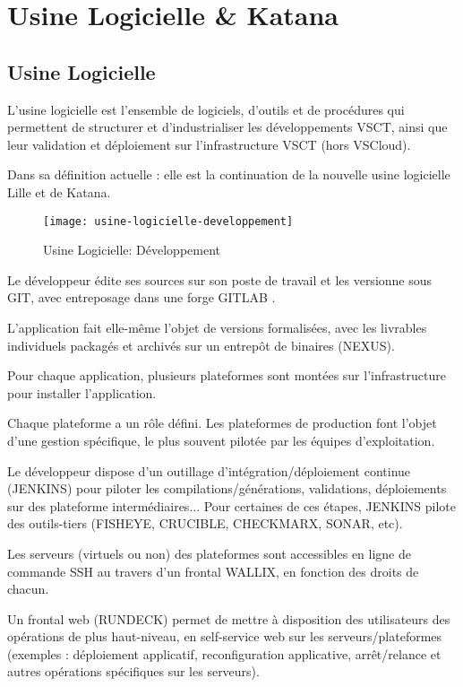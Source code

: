 \section{Usine Logicielle \& Katana}

\subsection{Usine Logicielle}
L'usine logicielle est l'ensemble de logiciels, d'outils et de procédures qui permettent de structurer et d'industrialiser les développements VSCT, ainsi que leur validation et déploiement sur l'infrastructure VSCT (hors VSCloud).

Dans sa définition actuelle : elle est la continuation de la nouvelle usine logicielle Lille et de Katana.

\begin{figure}[ht]
 \centering
 \texttt{[image: usine-logicielle-developpement]}
 \caption{Usine Logicielle: Développement}
\end{figure}

Le développeur édite ses sources sur son poste de travail et les versionne sous GIT, avec entreposage dans une forge GITLAB .

L'application fait elle-même l'objet de versions formalisées, avec les livrables individuels packagés et archivés sur un entrepôt de binaires (NEXUS).

Pour chaque application, plusieurs plateformes sont montées sur l'infrastructure pour installer l'application.

Chaque plateforme a un rôle défini. Les plateformes de production font l'objet d'une gestion spécifique, le plus souvent pilotée par les équipes d'exploitation.

Le développeur dispose d'un outillage d'intégration/déploiement continue (JENKINS) pour piloter les compilations/générations, validations, déploiements sur des plateforme intermédiaires...
Pour certaines de ces étapes, JENKINS pilote des outils-tiers (FISHEYE, CRUCIBLE, CHECKMARX, SONAR, etc).

Les serveurs (virtuels ou non) des plateformes sont accessibles en ligne de commande SSH au travers d'un frontal WALLIX, en fonction des droits de chacun.

Un frontal web (RUNDECK) permet de mettre à disposition des utilisateurs des opérations de plus haut-niveau, en self-service web sur les serveurs/plateformes (exemples : déploiement applicatif, reconfiguration applicative, arrêt/relance et autres opérations spécifiques sur les serveurs).

